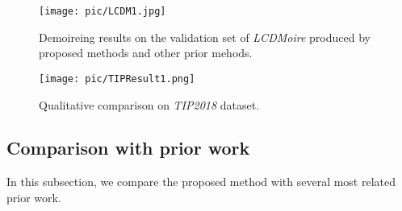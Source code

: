 \documentclass[10pt,twocolumn,letterpaper]{article}
\begin{document}
\begin{figure}
	\centering
	\texttt{[image: pic/LCDM1.jpg]}
	\caption{Demoireing results on the validation set of \emph{LCDMoire} produced by proposed methods and other prior mehods.}
	\label{LCDM}
\end{figure}


\begin{figure*}[t]
	\centering
	\texttt{[image: pic/TIPResult1.png]}
	\caption{Qualitative comparison on \textit{TIP2018} dataset.}
	\label{pic:TIP}
\end{figure*}

\subsection{Comparison with prior work}
\label{comp_prior}
In this subsection, we compare the proposed method with several most related prior work. 


\begin{table*}[t]
\normalsize 
  \centering
 	\caption{Performance comparison of MBCNN models and the top 7 participating methods in the AIM19 demoireing challenge.}
	\label{tab:challenge}
\end{table*}

\begin{table}[th]
\normalsize 
  \centering
 	\caption{Performance comparison of MBCNN models and other prior work on the validation set of \emph{LCDMoire}.}
	\label{table5}
\end{table}
\end{document}
